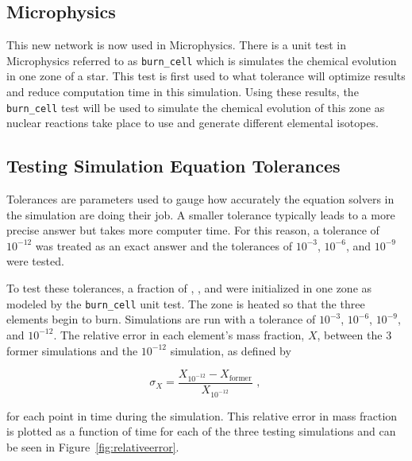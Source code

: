 \documentclass[11pt, oneside]{article}   	%
\begin{document}
  \subsection{Microphysics}
  
    This new network is now used in Microphysics. There is a unit test in Microphysics referred to as {\tt burn\_cell} which is simulates the chemical evolution in one zone of a star. This test is first used to what tolerance will optimize results and reduce computation time in this simulation. Using these results, the {\tt burn\_cell} test will be used to simulate the chemical evolution of this zone as nuclear reactions take place to use and generate different elemental isotopes. 
  
    \subsection{Testing Simulation Equation Tolerances}
  
      Tolerances are parameters used to gauge how accurately the equation solvers in the simulation are doing their job. A smaller tolerance typically leads to a more precise answer but takes more computer time. For this reason, a tolerance of $10^{-12}$ was treated as an exact answer and the tolerances of $10^{-3}$, $10^{-6}$, and $10^{-9}$ were tested. 
      
     
      To test these tolerances, a fraction of  , , and  were initialized in one zone as modeled by the {\tt burn\_cell} unit test. The zone is heated so that the three elements begin to burn. Simulations are run with a tolerance of $10^{-3}$, $10^{-6}$, $10^{-9}$, and $10^{-12}$. The relative error in each element's mass fraction, $X$, between the 3 former simulations and the $10^{-12}$ simulation, as defined by 
    
      \begin{equation}
        \sigma_X = \frac{X_{10^{-12}} - X_{\text{former}}}{X_{10^{-12}}} \text{    , }
        \label{eq:relativeerror}
      \end{equation}
    
      for each point in time during the simulation. This relative error in mass fraction is plotted as a function of time for each of the three testing simulations and can be seen in Figure~\ref{fig:relativeerror}.
    
\end{document}
